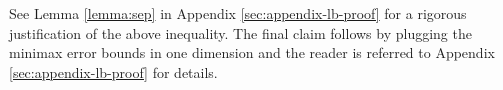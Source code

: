 See Lemma \ref{lemma:sep} in Appendix \ref{sec:appendix-lb-proof} for a rigorous justification of the above inequality.
The final claim follows by plugging the minimax error bounds in one dimension and the reader is referred to Appendix \ref{sec:appendix-lb-proof} for details.
\fi



%


